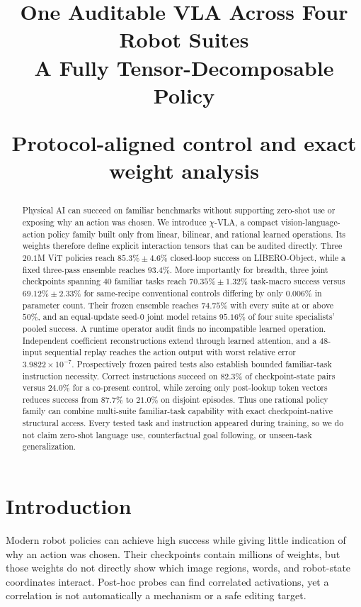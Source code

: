 \documentclass{article}
\title{\textbf{One Auditable VLA Across Four Robot Suites}\\[0.15em]
\textbf{A Fully Tensor-Decomposable Policy}\par\vspace{0.35em}
{\large Protocol-aligned control and exact weight analysis}}
\author{}
\date{}
\newcommand{\chivla}{$\chi$-VLA}
\begin{document}
\maketitle

\begin{abstract}
Physical AI can succeed on familiar benchmarks without supporting zero-shot use or exposing why
an action was chosen. We introduce \chivla, a compact vision-language-action policy family built
only from linear, bilinear, and rational learned operations. Its weights therefore define explicit
interaction tensors that can be audited directly. Three $20.1$M ViT policies reach
$85.3\%\pm4.6\%$ closed-loop success on LIBERO-Object, while a fixed three-pass ensemble reaches
$93.4\%$. More importantly for breadth, three joint checkpoints spanning $40$ familiar tasks
reach $70.35\%\pm1.32\%$ task-macro success versus $69.12\%\pm2.33\%$ for same-recipe
conventional controls differing by only $0.006\%$ in parameter count. Their frozen ensemble
reaches $74.75\%$ with every suite at or above $50\%$, and an equal-update seed-$0$ joint model
retains $95.16\%$ of four suite specialists' pooled success. A runtime operator audit finds no
incompatible learned operation. Independent coefficient reconstructions extend through learned
attention, and a $48$-input sequential replay reaches the action output with worst relative error
$3.9822\times10^{-7}$. Prospectively frozen paired tests also establish bounded familiar-task
instruction necessity. Correct instructions succeed on $82.3\%$ of checkpoint-state pairs versus
$24.0\%$ for a co-present control, while zeroing only post-lookup token vectors reduces success
from $87.7\%$ to $21.0\%$ on disjoint episodes. Thus one rational policy family can combine
multi-suite familiar-task capability with exact checkpoint-native structural access. Every tested
task and instruction appeared during training, so we do not claim zero-shot language use,
counterfactual goal following, or unseen-task generalization.
\end{abstract}

\section{Introduction}

Modern robot policies can achieve high success while giving little indication of why an action
was chosen. Their checkpoints contain millions of weights, but those weights do not directly
show which image regions, words, and robot-state coordinates interact. Post-hoc probes can find
correlated activations, yet a correlation is not automatically a mechanism or a safe editing
target.
\end{document}
